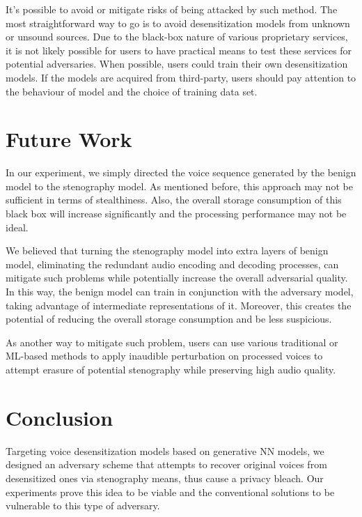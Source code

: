 \documentclass[journal]{IEEEtran} %
\begin{document}
\begin{CJK*}{UTF8}{gbsn}
It's possible to avoid or mitigate risks of being attacked by such method. The most straightforward way to go is to avoid desensitization models from unknown or unsound sources. Due to the black-box nature of various proprietary services, it is not likely possible for users to have practical means to test these services for potential adversaries. When possible, users could train their own desensitization models. If the models are acquired from third-party, users should pay attention to the behaviour of model and the choice of training data set.

\section{Future Work}

In our experiment, we simply directed the voice sequence generated by the benign model to the stenography model. As mentioned before, this approach may not be sufficient in terms of stealthiness. Also, the overall storage consumption of this black box will increase significantly and the processing performance may not be ideal.

We believed that turning the stenography model into extra layers of benign model, eliminating the redundant audio encoding and decoding processes, can mitigate such problems while potentially increase the overall adversarial quality. In this way, the benign model can train in conjunction with the adversary model, taking advantage of intermediate representations of it. Moreover, this creates the potential of reducing the overall storage consumption and be less suspicious.

As another way to mitigate such problem, users can use various traditional or ML-based methods to apply inaudible perturbation on processed voices to attempt erasure of potential stenography while preserving high audio quality.

\section{Conclusion}

Targeting voice desensitization models based on generative NN models, we designed an adversary scheme that attempts to recover original voices from desensitized ones via stenography means, thus cause a privacy bleach. Our experiments prove this idea to be viable and the conventional solutions to be vulnerable to this type of adversary.

\end{CJK*}
\end{document}
